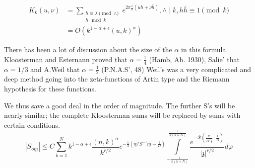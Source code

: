 \begin{lem}\label{part4:lec45:lem3}
  \begin{align*}
    K_k (u, \nu) & = \sum_{\substack{h \equiv \lambda \pmod{\wedge}\\h
    \mod k}} e^{2 \pi \frac{i}{k} (u h+ \nu \bar{h})}, \wedge\mid k, h
    \bar{h} \equiv 1 \pmod{k}\\
    & = O \left(k^{1- \alpha + \epsilon}(u, k)^\alpha \right)
  \end{align*}
\end{lem}

There has been a lot of discussion about the size of the $\alpha$ in
this formula. Kloosterman and Esternann proved that $\alpha =
\frac{1}{4}$ (Hamb, Ab. 1930), Salie' that $\alpha=1/3$ and A.Weil
that $\alpha = \frac{1}{2}$ (P.N.A.S', 48) Weil's was a very
complicated and deep method going into the zeta-functions of Artin
type and the Riemann hypothesis for these functions.

We thus save a good deal in the order of magnitude. The further S's
will be nearly similar; the complete Kloosterman sums will be replaced
by sums with certain conditions.
$$
|S_{o \underline{m}}| \leq C \sum^N_{k=1} k^{1- \alpha +
\epsilon}  \frac{(n, k)^\alpha}{k^{r/2}} e^{- \frac{\pi}{4}
  \left(\underline{m}'S^{-1} \underline{m}- \frac{1}{D}\right)}
\int\limits^{\frac{1}{k(k+N)}}_{-\frac{1}{k(k+N)}}
\frac{e^{-\mathscr{R} \left(\frac{\pi}{2k^2 \mathfrak{z}}\cdot
    \frac{1}{D} \right)}}{|\mathfrak{z}|^{r/2}} d \varphi 
$$

